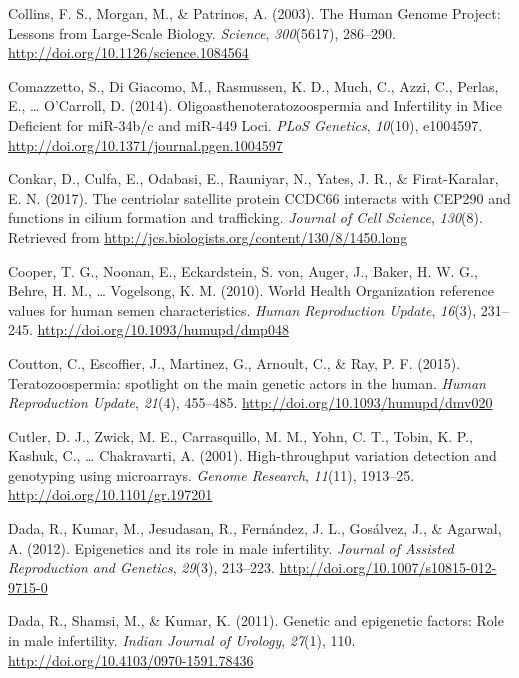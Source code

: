 \documentclass[12pt,twoside]{reedthesis}
\theoremstyle{definition}
\theoremstyle{definition}
\theoremstyle{remark}
\begin{document}
  \hypertarget{ref-Collins2003}{}
  Collins, F. S., Morgan, M., \& Patrinos, A. (2003). The Human Genome
  Project: Lessons from Large-Scale Biology. \emph{Science},
  \emph{300}(5617), 286--290. \url{http://doi.org/10.1126/science.1084564}
  
  \hypertarget{ref-Comazzetto2014}{}
  Comazzetto, S., Di Giacomo, M., Rasmussen, K. D., Much, C., Azzi, C.,
  Perlas, E., \ldots{} O'Carroll, D. (2014). Oligoasthenoteratozoospermia
  and Infertility in Mice Deficient for miR-34b/c and miR-449 Loci.
  \emph{PLoS Genetics}, \emph{10}(10), e1004597.
  \url{http://doi.org/10.1371/journal.pgen.1004597}
  
  \hypertarget{ref-Conkar2017}{}
  Conkar, D., Culfa, E., Odabasi, E., Rauniyar, N., Yates, J. R., \&
  Firat-Karalar, E. N. (2017). The centriolar satellite protein CCDC66
  interacts with CEP290 and functions in cilium formation and trafficking.
  \emph{Journal of Cell Science}, \emph{130}(8). Retrieved from
  \url{http://jcs.biologists.org/content/130/8/1450.long}
  
  \hypertarget{ref-Cooper2010}{}
  Cooper, T. G., Noonan, E., Eckardstein, S. von, Auger, J., Baker, H. W.
  G., Behre, H. M., \ldots{} Vogelsong, K. M. (2010). World Health
  Organization reference values for human semen characteristics.
  \emph{Human Reproduction Update}, \emph{16}(3), 231--245.
  \url{http://doi.org/10.1093/humupd/dmp048}
  
  \hypertarget{ref-Coutton2015}{}
  Coutton, C., Escoffier, J., Martinez, G., Arnoult, C., \& Ray, P. F.
  (2015). Teratozoospermia: spotlight on the main genetic actors in the
  human. \emph{Human Reproduction Update}, \emph{21}(4), 455--485.
  \url{http://doi.org/10.1093/humupd/dmv020}
  
  \hypertarget{ref-Cutler2001}{}
  Cutler, D. J., Zwick, M. E., Carrasquillo, M. M., Yohn, C. T., Tobin, K.
  P., Kashuk, C., \ldots{} Chakravarti, A. (2001). High-throughput
  variation detection and genotyping using microarrays. \emph{Genome
  Research}, \emph{11}(11), 1913--25.
  \url{http://doi.org/10.1101/gr.197201}
  
  \hypertarget{ref-Dada2012}{}
  Dada, R., Kumar, M., Jesudasan, R., Fernández, J. L., Gosálvez, J., \&
  Agarwal, A. (2012). Epigenetics and its role in male infertility.
  \emph{Journal of Assisted Reproduction and Genetics}, \emph{29}(3),
  213--223. \url{http://doi.org/10.1007/s10815-012-9715-0}
  
  \hypertarget{ref-Dada2011}{}
  Dada, R., Shamsi, M., \& Kumar, K. (2011). Genetic and epigenetic
  factors: Role in male infertility. \emph{Indian Journal of Urology},
  \emph{27}(1), 110. \url{http://doi.org/10.4103/0970-1591.78436}
  
\end{document}
